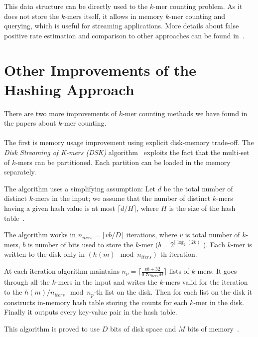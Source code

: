 This data structure can be directly used to the $k$-mer counting problem. As it does not store the $k$-mers itself, it allows in memory $k$-mer counting and querying, which is useful for streaming applications.
More details about false positive rate estimation and comparison to other approaches can be found in~\cite{khmer}.

\section[Other Improvements]{Other Improvements of the Hashing Approach}

There are two more improvements of $k$-mer counting methods we have found in the papers about $k$-mer counting.

\paragraph{} The first is memory usage improvement using explicit disk-memory trade-off. The \emph{Disk Streaming of K-mers (DSK)} algorithm~\cite{dsk} exploits the fact that the multi-set of $k$-mers can be partitioned. Each partition can be loaded in the memory separately.

The algorithm uses a simplifying assumption: Let $d$ be the total number of distinct $k$-mers in the input; we assume that the number of distinct $k$-mers having a given hash value is at most $\lceil d/H \rceil$, where $H$ is the size of the hash table~\cite{dsk}.

The algorithm works in $n_{iters} = \lceil vb/D\rceil$ iterations, where $v$ is total number of $k$-mers, $b$ is number of bits used to store the $k$-mer ($b = 2^{\lceil\log_2(2k)\rceil}$). Each $k$-mer is written to the disk only in $(h(m) \mod n_{iters})$-th iteration.

At each iteration algorithm maintains $n_p = \lceil\frac{vb+32}{0.7n_{iters}M}\rceil$ lists of $k$-mers.
It goes through all the $k$-mers in the input and writes the $k$-mers valid for the iteration to the $h(m)/n_{iters} \mod n_p$-th list on the disk.
Then for each list on the disk it constructs in-memory hash table storing the counts for each $k$-mer in the disk.
Finally it outputs every key-value pair in the hash table.

This algorithm is proved to use $D$ bits of disk space and $M$ bits of memory~\cite{dsk}.

